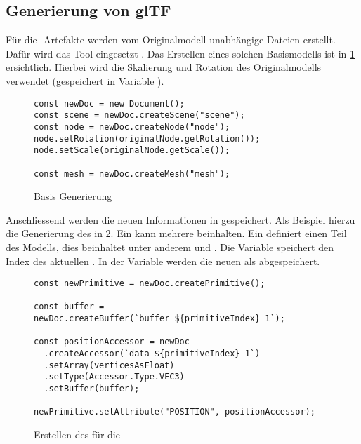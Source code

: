 \subsection{Generierung von glTF}

Für die -Artefakte werden vom Originalmodell unabhängige  Dateien erstellt. Dafür wird das Tool  eingesetzt \cite{gltfTransform}.
Das Erstellen eines solchen Basismodells ist in \ref{code:gltfTransform} ersichtlich. Hierbei wird die Skalierung und Rotation des Originalmodells verwendet (gespeichert in Variable ).

\begin{figure}[H]
  \begin{lstlisting}[style=JavaScript]
const newDoc = new Document();
const scene = newDoc.createScene("scene");
const node = newDoc.createNode("node");
node.setRotation(originalNode.getRotation());
node.setScale(originalNode.getScale());

const mesh = newDoc.createMesh("mesh");
  \end{lstlisting}
  \caption{Basis  Generierung}
  \label{code:gltfTransform}
\end{figure}

\pagebreak

Anschliessend werden die neuen Informationen in  gespeichert. Als Beispiel hierzu die Generierung des  in \ref{code:bufferCreation}. Ein  kann mehrere  beinhalten. Ein  definiert einen Teil des Modells, dies beinhaltet unter anderem  und . Die Variable  speichert den Index des aktuellen . In der Variable  werden die neuen  als  abgespeichert.

\begin{figure}[H]
  \begin{lstlisting}[style=JavaScript]
const newPrimitive = newDoc.createPrimitive();

const buffer = newDoc.createBuffer(`buffer_${primitiveIndex}_1`);

const positionAccessor = newDoc
  .createAccessor(`data_${primitiveIndex}_1`)
  .setArray(verticesAsFloat)
  .setType(Accessor.Type.VEC3)
  .setBuffer(buffer);

newPrimitive.setAttribute("POSITION", positionAccessor);
  \end{lstlisting}
  \caption{Erstellen des  für die }
  \label{code:bufferCreation}
\end{figure}


